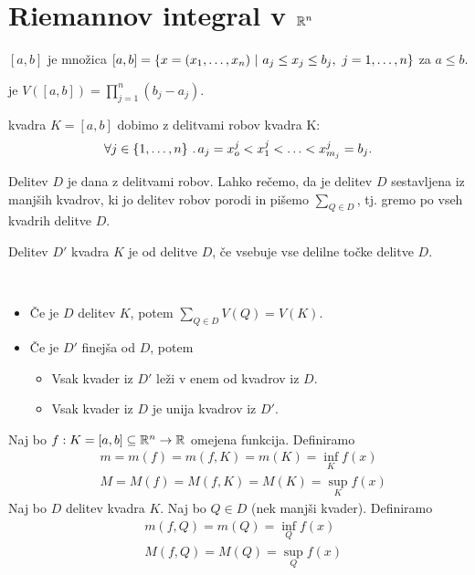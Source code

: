 \section{Riemannov integral v $\mathbb{R}^n$}
\begin{definicija}
     \([a,b]\) je množica \([a,b] = \left\{x = (x_1, \ldots, x_n) \ | \ a_j \leq x_j \leq b_j, \ j = 1, \ldots, n\right\}\) za \(a \leq b\). 

     je \(V([a,b]) = \prod_{j=1}^{n} (b_j - a_j)\).
\end{definicija}

\begin{definicija}
     kvadra \(K = [a,b]\) dobimo z delitvami robov kvadra K:
    \[\forall j \in \left\{1, \ldots, n\right\} \,.\, a_j = x_o^j < x_1^j < \ldots < x_{m_j}^j = b_j.\]
\end{definicija}

\begin{opomba}
    Delitev \(D\) je dana z delitvami robov. Lahko rečemo, da je delitev \(D\) sestavljena iz manjših kvadrov, ki jo delitev robov porodi in pišemo \(\sum_{Q \in D}\), tj. gremo po vseh kvadrih delitve \(D\).
\end{opomba}

\begin{definicija}
    Delitev \(D'\) kvadra \(K\) je  od delitve \(D\), če vsebuje vse delilne točke delitve \(D\).
\end{definicija}

\begin{opomba}
    \ 
    \begin{itemize}
        \item Če je \(D\) delitev \(K\), potem \(\sum_{Q \in D} V(Q) = V(K)\).
        \item Če je \(D'\) finejša od \(D\), potem
        \begin{itemize}
            \item Vsak kvader iz \(D'\) leži v enem od kvadrov iz \(D\).
            \item Vsak kvader iz \(D\) je unija kvadrov iz \(D'\).
        \end{itemize}
    \end{itemize}
\end{opomba}

Naj bo \(f: K = [a,b] \subseteq \mathbb{R}^n \to \mathbb{R}\) omejena funkcija. Definiramo
\begin{align*}
    &m = m(f) = m(f, K) = m(K) = \inf_K f(x)  \\
    &M = M(f) = M(f, K) = M(K) = \sup_K f(x) 
\end{align*}
Naj bo \(D\) delitev kvadra \(K\). Naj bo \(Q \in D\) (nek manjši kvader). Definiramo
\begin{align*}
    &m(f, Q) = m(Q) = \inf_Q f(x)  \\
    &M(f, Q) = M(Q) = \sup_Q f(x)  
\end{align*}


